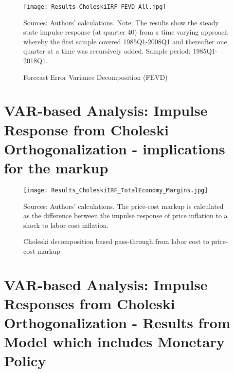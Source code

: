 \documentclass[11pt]{article}
\begin{document}
\begin{appendices}


\begin{figure}[!htbp]
\begin{center}
\caption{Forecast Error Variance Decomposition (FEVD)}\label{fig:all_choleski_FEVD}
\texttt{[image: Results\_CholeskiIRF\_FEVD\_All.jpg]}
\begin{minipage}{\textwidth} {\footnotesize
Sources: Authors' calculations.
Note: The results show the steady state impulse response (at quarter 40) from a time varying approach whereby the first sample covered 1985Q1-2008Q1 and thereafter one quarter at a time was recursively added.
Sample period: 1985Q1-2018Q1.\par}
\end{minipage}
\end{center}
\end{figure}


\clearpage

\section{VAR-based Analysis: Impulse Response from Choleski Orthogonalization - implications for the markup}
\label{AppendixCholeskiMargins}


\begin{figure}[!htbp]
\begin{center}
\caption{Choleski decomposition based pass-through from labor cost to price-cost markup}\label{fig:Figure_CholeskiIRF_TotalEconomy_Margins}
\texttt{[image: Results\_CholeskiIRF\_TotalEconomy\_Margins.jpg]}
\begin{minipage}{\textwidth} {\footnotesize
Sources: Authors' calculations. The price-cost markup is calculated as the difference between the impulse response of price inflation to a shock to labor cost inflation.\par}
\end{minipage}
\end{center}
\end{figure}

\clearpage
\pagebreak

\section{VAR-based Analysis: Impulse Responses from Choleski Orthogonalization - Results from Model which includes Monetary Policy}
\label{AppendixCholeskiCountriesMP}



\end{appendices}
\end{document}
